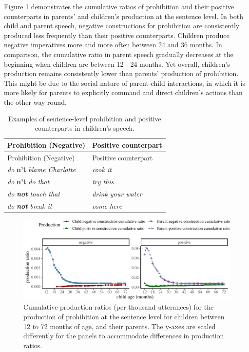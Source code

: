 \documentclass[
  man,floatsintext]{apa6}
\begin{document}
Figure \ref{fig:prohibition} demonstrates the cumulative ratios of prohibition and their positive counterparts in parents' and children's production at the sentence level. In both child and parent speech, negative constructions for prohibition are consistently produced less frequently than their positive counterparts. Children produce negative imperatives more and more often between 24 and 36 months. In comparison, the cumulative ratio in parent speech gradually decreases at the beginning when children are between 12 - 24 months. Yet overall, children's production remains consistently lower than parents' production of prohibition. This might be due to the social nature of parent-child interactions, in which it is more likely for parents to explicitly command and direct children's actions than the other way round.

\begin{longtable}[]{@{}ll@{}}
\caption{\label{tab:prohibit} Examples of sentence-level prohibition and positive counterparts in children's speech.}\tabularnewline
\toprule\noalign{}
Prohibition (Negative) & Positive counterpart \\
\midrule\noalign{}
\endfirsthead
\toprule\noalign{}
Prohibition (Negative) & Positive counterpart \\
\midrule\noalign{}
\endhead
\bottomrule\noalign{}
\endlastfoot
\emph{do} \textbf{n't} \emph{blame Charlotte} & \emph{cook it} \\
\emph{do} \textbf{n't} \emph{do that} & \emph{try this} \\
\emph{do} \textbf{\emph{not}} \emph{touch that} & \emph{drink your water} \\
\emph{do} \textbf{\emph{not}} \emph{break it} & \emph{come here} \\
\end{longtable}

\begin{figure}[H]

{\centering \includegraphics{neg_construction_article_files/figure-latex/prohibition-1} 

}

\caption{Cumulative production ratios (per thousand utterances) for the production of prohibition at the sentence level for children between 12 to 72 months of age, and their parents. The y-axes are scaled differently for the panels to accommodate differences in production ratios.}\label{fig:prohibition}
\end{figure}
\end{document}
